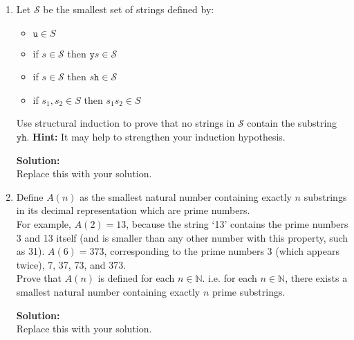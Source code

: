 \documentclass[boldsans]{article}
\newcommand{\N}{\mathbb{N}}
\newenvironment{solution}
{\bigskip \noindent \textbf{Solution: \\}}
{}
\begin{document}
\begin{enumerate}
In this question, you will show that, taken together, these three statements comprise a valid proof that $P$ holds for all natural numbers.
\begin{enumerate}
\item Use complete induction to prove that $\forall n \in \N, P(n)$.

\begin{solution}
Replace this with your solution to part a.
\end{solution}
\item If we failed to prove \eqref{double}, but kept the other two statements, what values would we be able to conclude that $P$ holds for? Repeat for \eqref{back} and \eqref{basis}.

\begin{solution}
Replace this with your solution to part b.
\end{solution}
\end{enumerate}

\newpage
\item Let $\mathcal{S}$ be the smallest set of strings defined by:
\begin{itemize}
    \item $\mathtt{u} \in S$
    \item if $s \in \mathcal{S}$ then $\mathtt{y}s \in \mathcal{S}$
    \item if $s \in \mathcal{S}$ then $s\mathtt{h} \in \mathcal{S}$
    \item if $s_1, s_2 \in S$ then $s_1 s_2 \in S$
\end{itemize}
Use structural induction to prove that no strings in $\mathcal{S}$ contain the substring $\mathtt{yh}$. \textbf{Hint:} It may help to strengthen your induction hypothesis.

\begin{solution}
Replace this with your solution.
\end{solution}

\newpage
\item Define $A(n)$ as the smallest natural number containing exactly $n$ substrings in its decimal representation which are prime numbers.\\
For example, $A(2) = 13$, because the string `13' contains the prime numbers 3 and 13 itself (and is smaller than any other number with this property, such as 31). $A(6) = 373$, corresponding to the prime numbers 3 (which appears twice), 7, 37, 73, and 373.\\
Prove that $A(n)$ is defined for each $n \in \N$. i.e. for each $n \in \N$, there exists a smallest natural number containing exactly $n$ prime substrings.

\begin{solution}
Replace this with your solution.
\end{solution}

\end{enumerate}
\end{document}
